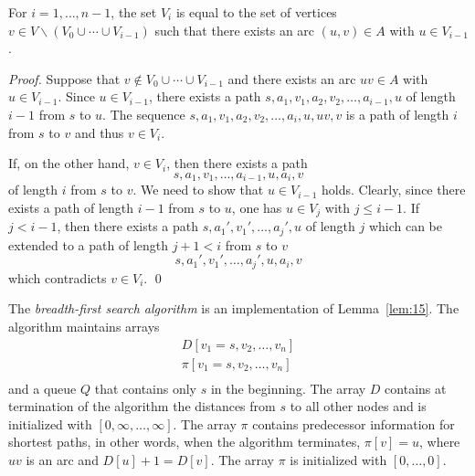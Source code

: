 \begin{lemma}
  \label{lem:15}
  For $i=1,\ldots,n-1$, the set   $V_{i}$ is equal to the set of 
  vertices $v \in V \backslash (V_0\cup\cdots\cup V_{i-1})$ such that there exists an arc 
  $(u,v) \in A$ with $u \in V_{i-1}$.
\end{lemma}


\begin{proof}
  Suppose that $v \notin V_0\cup\cdots\cup V_{i-1}$ and there exists an arc $uv\in A$
  with $u \in V_{i-1}$. Since $u \in V_{i-1}$, there exists a path
  $s,a_1,v_1,a_2,v_2,\ldots,a_{i-1},u$ of length $i-1$ from $s$ to $u$. The
  sequence  $s,a_1,v_1,a_2,v_2,\ldots,a_i,u,uv,v$ is a path of length
  $i$ from $s$ to $v$ and thus $v \in V_{i}$. 

  If, on the other hand, $v \in V_{i}$, then there exists a path 
  \begin{displaymath}
    s,a_1,v_1,\ldots,a_{i-1},u,a_{i},v
  \end{displaymath}
  of length $i$ from $s$ to $v$. We need to show that $u \in V_{i-1}$
  holds. Clearly, since there exists a path of length $i-1$ from $s$ to
  $u$, one has $u \in V_j$ with $j\leq i-1$. If $j<i-1$, then there exists
  a path $s,a_1',v_1',\ldots,a_j',u$ of length $j$ which can be extended
  to a path of length $j+1<i$ from $s$ to $v$
  \begin{displaymath}
    s,a_1',v_1',\ldots,a_j',u,a_{i},v
  \end{displaymath}
  which contradicts $v\in V_i$.  \qed

\end{proof}


The  \emph{breadth-first search algorithm} is an implementation of
Lemma~\ref{lem:15}. 
The algorithm maintains arrays 
\begin{displaymath}
  \begin{array}{c}
    D[v_1=s,v_2,\ldots,v_n]\\
    \pi[v_1=s,v_2,\ldots,v_n]\\
  \end{array}
\end{displaymath}
and a queue $Q$ that contains only $s$ in the beginning. The array
$D$ contains at termination of the algorithm the distances from $s$ to
all other nodes and is initialized with $[0,\infty,\ldots,\infty]$.  
The array $\pi$ contains predecessor information for
shortest paths, in other words, when the algorithm terminates, $\pi[v]
= u$, where $uv$ is an arc and $D[u]+1 = D[v]$. The array $\pi$ is
initialized with $[0,\ldots,0]$.


